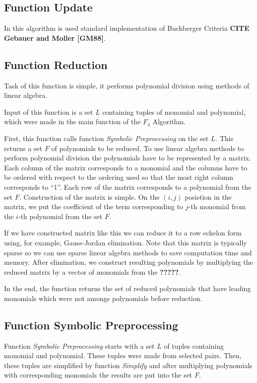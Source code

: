 \subsection{Function Update}
In this algorithm is used standard implementation of Buchberger Criteria \textbf{CITE Gebauer and Moller [GM88]}.

\subsection{Function Reduction}
Task of this function is simple, it performs polynomial division using methods of linear algebra.

Input of this function is a set $L$ containing tuples of monomial and polynomial, which were made in the main function of the $F_4$ Algorithm.

First, this function calls function \textit{Symbolic Preprocessing} on the set $L$. This returns a set $F$ of polynomials to be reduced. To use linear algebra methods to perform polynomial division the polynomials have to be represented by a matrix. Each column of the matrix corresponds to a monomial and the columns have to be ordered with respect to the ordering used so that the most right column corresponds to ``1''. Each row of the matrix corresponds to a polynomial from the set $F$. Construction of the matrix is simple. On the $(i, j)$ posistion in the matrix, we put the coefficient of the term corresponding to $j$-th monomial from the $i$-th polynomial from the set $F$.

If we have constructed matrix like this we can reduce it to a row echelon form using, for example, Gauss-Jordan elimination. Note that this matrix is typically sparse so we can use sparse linear algebra methods to save computation time and memory. After elimination, we construct resulting polynomials by multiplying the reduced matrix by a vector of monomials from the \textbf{?????}.

In the end, the function returns the set of reduced polynomials that have leading monomials which were not amongs polynomials before reduction.

\subsection{Function Symbolic Preprocessing}
Function \textit{Symbolic Preprocessing} starts with a set $L$ of tuples containing monomial and polynomial. These tuples were made from selected pairs. Then, these tuples are simplified by function \textit{Simplify} and after multiplying polynomials with corresponding monomials the results are put into the set $F$.

